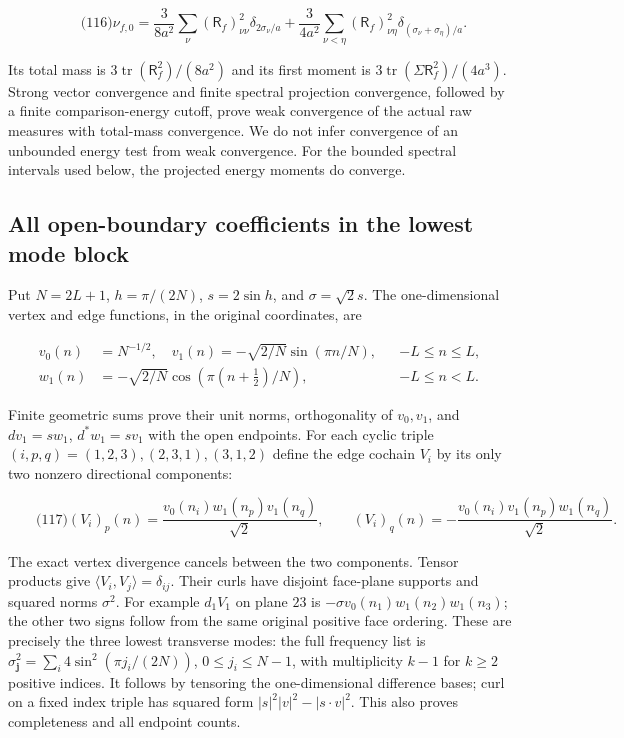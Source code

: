 \[
\qquad\text{(116)}
 \nu_{f,0}=\frac3{8a^2}\sum_\nu(\mathsf R_f)_{\nu\nu}^2
                       \delta_{2\sigma_\nu/a}
 +\frac3{4a^2}\sum_{\nu<\eta}(\mathsf R_f)_{\nu\eta}^2
                       \delta_{(\sigma_\nu+\sigma_\eta)/a}.
\]

Its total mass is \(3\operatorname{tr}(\mathsf R_f^2)/(8a^2)\) and its
first moment is \(3\operatorname{tr}(\Sigma\mathsf R_f^2)/(4a^3)\).
Strong vector convergence and finite spectral projection convergence,
followed by a finite comparison-energy cutoff, prove weak convergence of
the actual raw measures with total-mass convergence. We do not infer
convergence of an unbounded energy test from weak convergence. For the
bounded spectral intervals used below, the projected energy moments do
converge.

\subsection{All open-boundary coefficients in the lowest mode
block}\label{fabel-low-mode-transfer-md-all-open-boundary-coefficients-in-the-lowest-mode-block}

Put \(N=2L+1\), \(h=\pi/(2N)\), \(s=2\sin h\), and \(\sigma=\sqrt2s\).
The one-dimensional vertex and edge functions, in the original
coordinates, are

\[
\begin{aligned}
 v_0(n)&=N^{-1/2},\quad
 v_1(n)=-\sqrt{2/N}\sin(\pi n/N), &&-L\le n\le L,\\
 w_1(n)&=-\sqrt{2/N}\cos(\pi(n+\tfrac12)/N), &&-L\le n<L.
\end{aligned}
\]

Finite geometric sums prove their unit norms, orthogonality of
\(v_0,v_1\), and \(dv_1=sw_1\), \(d^*w_1=sv_1\) with the open endpoints.
For each cyclic triple \((i,p,q)=(1,2,3),(2,3,1),(3,1,2)\) define the
edge cochain \(V_i\) by its only two nonzero directional components:

\[
\qquad\text{(117)}
 (V_i)_p(n)=\frac{v_0(n_i)w_1(n_p)v_1(n_q)}{\sqrt2},\qquad
 (V_i)_q(n)=-\frac{v_0(n_i)v_1(n_p)w_1(n_q)}{\sqrt2}.
\]

The exact vertex divergence cancels between the two components. Tensor
products give \(\langle V_i,V_j\rangle=\delta_{ij}\). Their curls have
disjoint face-plane supports and squared norms \(\sigma^2\). For example
\(d_1V_1\) on plane \(23\) is \(-\sigma v_0(n_1)w_1(n_2)w_1(n_3)\); the
other two signs follow from the same original positive face ordering.
These are precisely the three lowest transverse modes: the full
frequency list is \(\sigma_{\mathbf j}^2=\sum_i4\sin^2(\pi j_i/(2N))\),
\(0\le j_i\le N-1\), with multiplicity \(k-1\) for \(k\ge2\) positive
indices. It follows by tensoring the one-dimensional difference bases;
curl on a fixed index triple has squared form
\(|s|^2|v|^2-|s\cdot v|^2\). This also proves completeness and all
endpoint counts.

